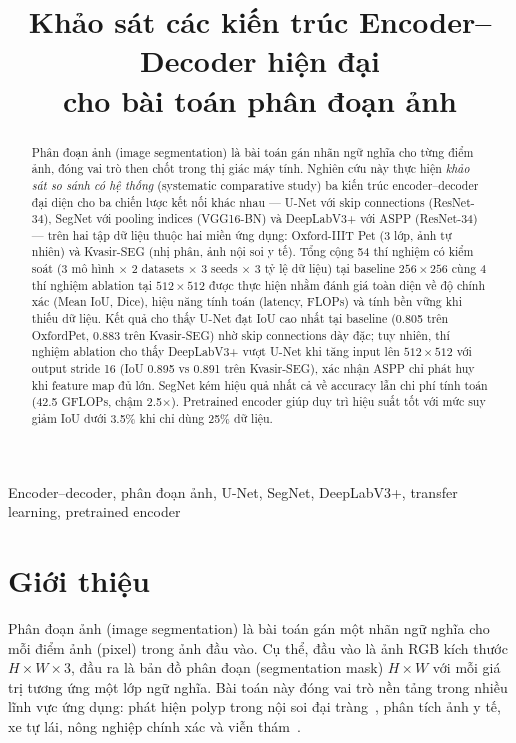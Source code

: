 \documentclass{article}
\title{Khảo sát các kiến trúc Encoder--Decoder hiện đại\\cho bài toán phân đoạn ảnh}
\begin{document}
\maketitle

\begin{abstract}
Phân đoạn ảnh (image segmentation) là bài toán gán nhãn ngữ nghĩa cho từng điểm ảnh, đóng vai trò then chốt trong thị giác máy tính.
Nghiên cứu này thực hiện \emph{khảo sát so sánh có hệ thống} (systematic comparative study) ba kiến trúc encoder--decoder đại diện cho ba chiến lược kết nối khác nhau --- U-Net với skip connections (ResNet-34), SegNet với pooling indices (VGG16-BN) và DeepLabV3+ với ASPP (ResNet-34) --- trên hai tập dữ liệu thuộc hai miền ứng dụng: Oxford-IIIT Pet (3 lớp, ảnh tự nhiên) và Kvasir-SEG (nhị phân, ảnh nội soi y tế).
Tổng cộng 54 thí nghiệm có kiểm soát (3 mô hình $\times$ 2 datasets $\times$ 3 seeds $\times$ 3 tỷ lệ dữ liệu) tại baseline $256{\times}256$ cùng 4 thí nghiệm ablation tại $512{\times}512$ được thực hiện nhằm đánh giá toàn diện về độ chính xác (Mean IoU, Dice), hiệu năng tính toán (latency, FLOPs) và tính bền vững khi thiếu dữ liệu.
Kết quả cho thấy U-Net đạt IoU cao nhất tại baseline (0.805 trên OxfordPet, 0.883 trên Kvasir-SEG) nhờ skip connections dày đặc; tuy nhiên, thí nghiệm ablation cho thấy DeepLabV3+ vượt U-Net khi tăng input lên $512{\times}512$ với output stride 16 (IoU 0.895 vs 0.891 trên Kvasir-SEG), xác nhận ASPP chỉ phát huy khi feature map đủ lớn.
SegNet kém hiệu quả nhất cả về accuracy lẫn chi phí tính toán (42.5 GFLOPs, chậm 2.5$\times$).
Pretrained encoder giúp duy trì hiệu suất tốt với mức suy giảm IoU dưới 3.5\% khi chỉ dùng 25\% dữ liệu.
\end{abstract}

\begin{keywords}
Encoder--decoder, phân đoạn ảnh, U-Net, SegNet, DeepLabV3+, transfer learning, pretrained encoder
\end{keywords}

\section{Giới thiệu}
\label{sec:intro}

Phân đoạn ảnh (image segmentation) là bài toán gán một nhãn ngữ nghĩa cho mỗi điểm ảnh (pixel) trong ảnh đầu vào.
Cụ thể, đầu vào là ảnh RGB kích thước $H{\times}W{\times}3$, đầu ra là bản đồ phân đoạn (segmentation mask) $H{\times}W$ với mỗi giá trị tương ứng một lớp ngữ nghĩa.
Bài toán này đóng vai trò nền tảng trong nhiều lĩnh vực ứng dụng: phát hiện polyp trong nội soi đại tràng~\cite{jha2020kvasir}, phân tích ảnh y tế, xe tự lái, nông nghiệp chính xác và viễn thám~\cite{minaee2021image}.
\end{document}
